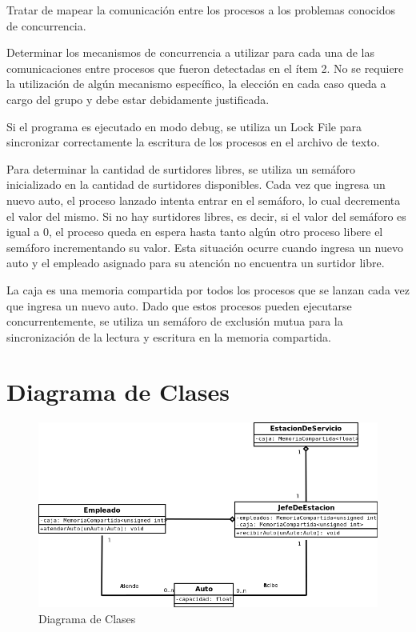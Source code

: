 \documentclass[12pt,a4paper,titlepage,oneside]{article}
\renewenvironment{itemize}{
 \begin{list}{}{
  \setlength{\leftmargin}{1.5em}
 }
}{
 \end{list}
}
\begin{document}
\begin{enumerate}
\item Tratar de mapear la comunicación entre los procesos a los problemas conocidos de concurrencia.

\item Determinar los mecanismos de concurrencia a utilizar para cada una de las comunicaciones entre procesos que fueron detectadas en el ítem 2. No se requiere la utilización de algún mecanismo específico, la elección en cada caso queda a cargo del grupo y debe estar debidamente justificada.

\begin{itemize}
\item[•] Si el programa es ejecutado en modo debug, se utiliza un Lock File para sincronizar correctamente la escritura de los procesos en el archivo de texto.
\item[•] Para determinar la cantidad de surtidores libres, se utiliza un semáforo inicializado en la cantidad de surtidores disponibles. Cada vez que ingresa un nuevo auto, el proceso lanzado intenta entrar en el semáforo, lo cual decrementa el valor del mismo. Si no hay surtidores libres, es decir, si el valor del semáforo es igual a 0, el proceso queda en espera hasta tanto algún otro proceso libere el semáforo incrementando su valor. Esta situación ocurre cuando ingresa un nuevo auto y el empleado asignado para su atención no encuentra un surtidor libre.
\item[•] La caja es una memoria compartida por todos los procesos que se lanzan cada vez que ingresa un nuevo auto. Dado que estos procesos pueden ejecutarse concurrentemente, se utiliza un semáforo de exclusión mutua para la sincronización de la lectura y escritura en la memoria compartida.
\end{itemize}
\end{enumerate}

\section{Diagrama de Clases}
\begin{figure}[hbtp]
\centering
\includegraphics[scale=0.5]{diagramaDeClases.png}
\caption{Diagrama de Clases}
\end{figure}
\end{document}
